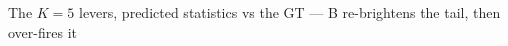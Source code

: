 \begin{frame}{The $K{=}5$ levers, predicted statistics vs the GT --- B re-brightens the tail, then over-fires it}
\end{frame}

